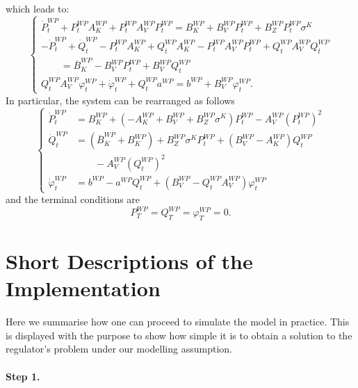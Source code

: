 \documentclass[11pt,twoside]{amsart}
\theoremstyle{definition}
\numberwithin{equation}{section}
\renewcommand{\bar}{\overline}
\begin{document}
which leads to: 
\begin{equation*}
    \begin{cases}
        \dot{P}^{WP}_t + P^{WP}_t A^{WP}_K + P^{WP}_tA^{WP}_V P^{WP}_t = B^{WP}_K + B^{WP}_VP^{WP}_t + B^{WP}_Z P^{WP}_t \sigma^K\\
        -\dot{P}^{WP}_t + \dot{Q}^{WP}_t - P^{WP}_t A^{WP}_K + Q^{WP}_t A^{WP}_K - P^{WP}_t A^{WP}_V P^{WP}_t + Q^{WP}_tA^{WP}_VQ^{WP}_t\\
        \qquad=\bar{B}^{WP}_K - B^{WP}_V P^{WP}_t + B^{WP}_VQ^{WP}_t\\
        Q^{WP}_t A^{WP}_V \varphi^{WP}_t + \dot{\varphi}^{WP}_t+ Q^{WP}_t a^{WP}= b^{WP}+ B^{WP}_V\varphi^{WP}_t.
    \end{cases}
\end{equation*}
In particular, the system can be rearranged as follows
\begin{equation*}
    \begin{cases}
        \dot{P}^{WP}_t &=  B^{WP}_K + (-A^{WP}_K + B^{WP}_V + B^{WP}_Z \sigma^K) P^{WP}_t -A^{WP}_V (P^{WP}_t)^2\\
        \dot{Q}^{WP}_t &= (\bar{B}^{WP}_K + B^{WP}_K) + B^{WP}_Z \sigma^K P^{WP}_t  + (B^{WP}_V - A^{WP}_K)Q^{WP}_t \\
        &\qquad - A^{WP}_V(Q^{WP}_t)^2\\
        \dot{\varphi}^{WP}_t &= b^{WP} - a^{WP}Q^{WP}_t + (B^{WP}_V - Q^{WP}_t A^{WP}_V) \varphi^{WP}_t
    \end{cases}
\end{equation*}
and the terminal conditions are
\begin{equation*}
    P^{WP}_T = Q^{WP}_T = \varphi^{WP}_T = 0.
\end{equation*}

\section{Short Descriptions of the Implementation}
\label{app: sbs implementation} 
Here we summarise how one can proceed to simulate the model in practice. 
This is displayed with the purpose to show how simple it is to obtain a solution to the regulator's problem  under our modelling assumption.


\paragraph{\textbf{Step 1.}}
\end{document}
